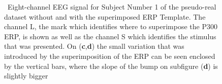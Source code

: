 \documentclass[brainsci,article,accept,moreauthors,pdftex,10pt,a4paper]{mdpi}
\begin{document}
\begin{figure}[H]
\centering
{}
\caption{~Eight-channel EEG signal for Subject Number 1 of the pseudo-real dataset without and with the superimposed ERP Template. The channel L, the mark which identifies where to superimpose the P300 ERP, is shown as well as the channel S which identifies the stimulus that was presented. On (\textbf{c},\textbf{d}) the small variation that was introduced by the superimposition of the ERP can be seen enclosed by the vertical bars, where the slope of the bump on subfigure (\textbf{d}) is slightly bigger}
\label{fig:gains}
\end{figure}
\end{document}
